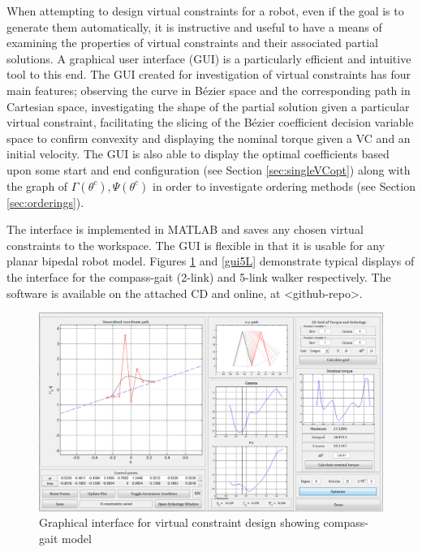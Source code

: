 When attempting to design virtual constraints for a robot, even if the goal is to generate them automatically, it is instructive and useful to have a means of examining the properties of virtual constraints and their associated partial solutions. A graphical user interface (GUI) is a particularly efficient and intuitive tool to this end. The GUI created for investigation of virtual constraints has four main features; observing the curve in Bézier space and the corresponding path in Cartesian space, investigating the shape of the partial solution given a particular virtual constraint, facilitating the slicing of the Bézier coefficient decision variable space to confirm convexity and displaying the nominal torque given a VC and an initial velocity. The GUI is also able to display the optimal coefficients based upon some start and end configuration (see Section \ref{sec:singleVCopt}) along with the graph of $\Gamma(\theta^c), \Psi(\theta^c)$ in order to investigate ordering methods (see Section \ref{sec:orderings}).

The interface is implemented in MATLAB and saves any chosen virtual constraints to the workspace. The GUI is flexible in that it is usable for any planar bipedal robot model. Figures \ref{fig:guiCG} and \ref{gui5L} demonstrate typical displays of the interface for the compass-gait (2-link) and 5-link walker respectively. The software is available {\color{orange} on the attached CD and online, at <github-repo>}.

\begin{figure}
	\centering
	\includegraphics[width=0.9\linewidth]{4VirtConstLib/guiVC.png}
	\caption{Graphical interface for virtual constraint design showing compass-gait model}
	\label{fig:guiCG}
\end{figure}